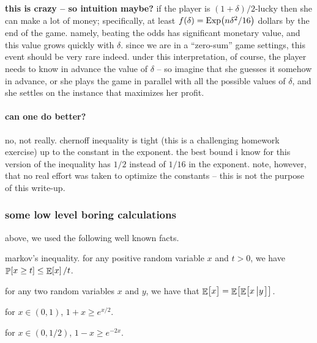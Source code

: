 \medskip%
\noindent%
\textbf{this is crazy -- so intuition maybe?} %
if the player is $(1+\delta)/2$-lucky then she can make a lot of
money; specifically, at least $f(\delta)=\Exp\pth{n \delta^2 / 16}$
dollars by the end of the game. namely, beating the odds has
significant monetary value, and this value grows quickly with
$\delta$. since we are in a ``zero-sum'' game settings, this event
should be very rare indeed. under this interpretation, of course, the
player needs to know in advance the value of $\delta$ -- so imagine
that she guesses it somehow in advance, or she plays the game in
parallel with all the possible values of $\delta$, and she settles on
the instance that maximizes her profit.

\paragraph*{can one do better?}
no, not really. chernoff inequality is tight (this is a challenging
homework exercise) up to the constant in the exponent. the best bound
i know for this version of the inequality has $1/2$ instead of $1/16$
in the exponent. note, however, that no real effort was taken to
optimize the constants -- this is not the purpose of this write-up.



\subsubsection{some low level boring calculations}

above, we used the following well known facts.
\begin{lemma}
    \begin{enumerate*}[label=(\alph*)]
        \item markov's inequality. for any positive random variable
        $x$ and $t > 0$, we have $\Prob{x \geq t} \leq \Ex{x}/t$.
        
        \item for any two random variables $x$ and $y$, we have that
        $\mathop{\mathbb{E}}\!\left[ {\bigl. x} \right] = \mathop{\mathbb{E}}\!\left[ { \bigl. \mathop{\mathbb{E}}\!\left[ { x \left| \bigl. {y}
              \right. } \right]} \right]$.
        
        \item for $x \in (0,1)$, $1+x \geq e^{x/2}$.
        
        \item for $x \in (0,1/2)$, $1-x \geq e^{-2x}$.
    \end{enumerate*}
\end{lemma}

